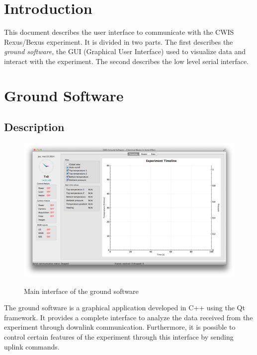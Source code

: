 \documentclass[11pt,a4paper,oneside]{report}
\begin{document}
\titleGM

\tableofcontents

\chapter{Introduction}

This document describes the user interface to communicate with the CWIS Rexus/Bexus experiment.
It is divided in two parts.
The first describes the \emph{ground software}, the GUI (Graphical User Interface) used to visualize data and interact with the experiment.
The second describes the low level serial interface.

\chapter{Ground Software}

\section{Description}

\begin{figure}[!h]
\center
\includegraphics[width=15cm]{images/gs_main.png}
\label{image:gs_main}
\caption{Main interface of the ground software}
\end{figure}

The ground software is a graphical application developed in C++ using the Qt framework.
It provides a complete interface to analyze the data received from the experiment through downlink communication.
Furthermore, it is possible to control certain features of the experiment through this interface by sending uplink commands. \\
\end{document}
